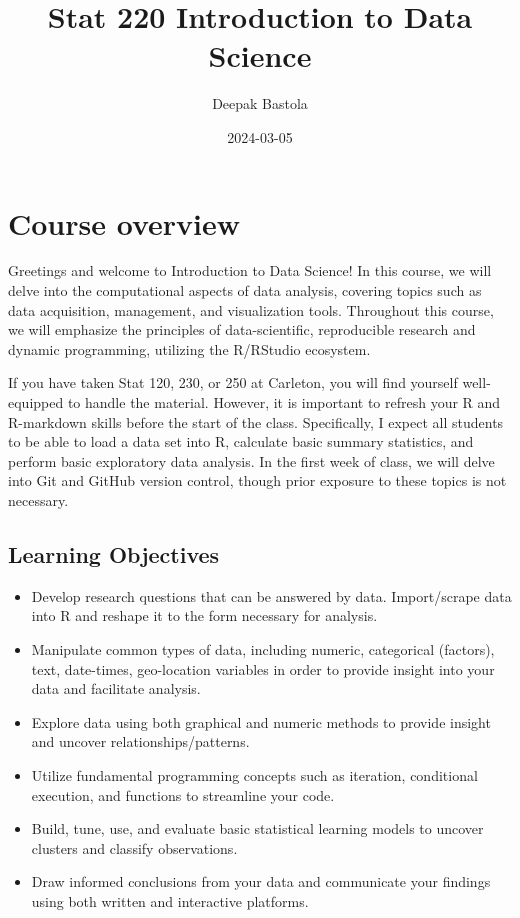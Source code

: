 \documentclass[
]{book}
\title{Stat 220 Introduction to Data Science}
\author{Deepak Bastola}
\date{2024-03-05}
\providecommand{\tightlist}{%
  \setlength{\itemsep}{0pt}\setlength{\parskip}{0pt}}
\begin{document}
\maketitle

{
\setcounter{tocdepth}{1}
\tableofcontents
}
\hypertarget{course-overview}{%
\chapter*{Course overview}\label{course-overview}}

Greetings and welcome to Introduction to Data Science! In this course, we will delve into the computational aspects of data analysis, covering topics such as data acquisition, management, and visualization tools. Throughout this course, we will emphasize the principles of data-scientific, reproducible research and dynamic programming, utilizing the R/RStudio ecosystem.

If you have taken Stat 120, 230, or 250 at Carleton, you will find yourself well-equipped to handle the material. However, it is important to refresh your R and R-markdown skills before the start of the class. Specifically, I expect all students to be able to load a data set into R, calculate basic summary statistics, and perform basic exploratory data analysis. In the first week of class, we will delve into Git and GitHub version control, though prior exposure to these topics is not necessary.

\hypertarget{learning-objectives}{%
\section{Learning Objectives}\label{learning-objectives}}

\begin{itemize}
\tightlist
\item
  Develop research questions that can be answered by data. Import/scrape data into R and reshape it to the form necessary for analysis.
\item
  Manipulate common types of data, including numeric, categorical (factors), text, date-times, geo-location variables in order to provide insight into your data and facilitate analysis.
\item
  Explore data using both graphical and numeric methods to provide insight and uncover relationships/patterns.
\item
  Utilize fundamental programming concepts such as iteration, conditional execution, and functions to streamline your code.
\item
  Build, tune, use, and evaluate basic statistical learning models to uncover clusters and classify observations.
\item
  Draw informed conclusions from your data and communicate your findings using both written and interactive platforms.
\end{itemize}
\end{document}
